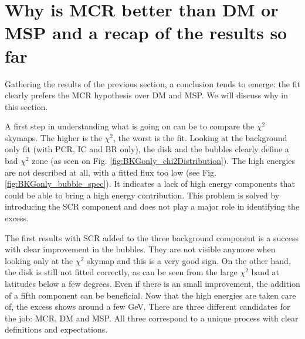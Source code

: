 

\section{Why is MCR better than DM or MSP and a recap of the results so far}
%

Gathering the results of the previous section, a conclusion tends to emerge: the fit clearly prefers the MCR hypothesis over DM and MSP. We will discuss why in this section.

A first step in understanding what is going on can be to compare the $\chi^2$ skymaps. The higher is the $\chi^2$, the worst is the fit. Looking at the background only fit (with PCR, IC and BR only), the disk and the bubbles clearly define a bad $\chi^2$ zone (as seen on Fig. \ref{fig:BKGonly_chi2Distribution}). The high energies are not described at all, with a fitted flux too low (see Fig. \ref{fig:BKGonly_bubble_spec}). It indicates a lack of high energy components that could be able to bring a high energy contribution. This problem is solved by introducing the SCR component and does not play a major role in identifying the excess.


The first results with SCR added to the three background component is a success with clear improvement in the bubbles. They are not visible anymore when looking only at the $\chi^2$ skymap and this is a very good sign. On the other hand, the disk is still not fitted correctly, as can be seen from the large $\chi^2$ band at latitudes below a few degrees. Even if there is an small improvement, the addition of a fifth component can be beneficial.
Now that the high energies are taken care of, the excess shows around a few GeV. There are three different candidates for the job: MCR, DM and MSP. All three correspond to a unique process with clear definitions and expectations.



